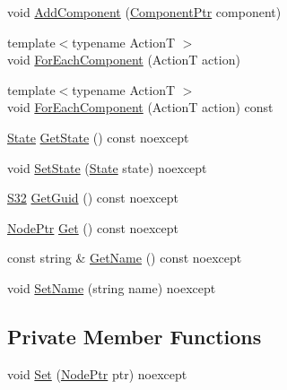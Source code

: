 \begin{DoxyCompactItemize}
\item 
void \hyperlink{classmage_1_1_node_a53172eaa92e0fa127bfe362349c96734}{Add\+Component} (\hyperlink{classmage_1_1_node_a46b7e1f4f5b98bfa78ed96a80797a4ba}{Component\+Ptr} component)
\item 
{\footnotesize template$<$typename ActionT $>$ }\\void \hyperlink{classmage_1_1_node_ac90a83642d3043ac6fc4efd14f922877}{For\+Each\+Component} (ActionT action)
\item 
{\footnotesize template$<$typename ActionT $>$ }\\void \hyperlink{classmage_1_1_node_ac3c83c2fcd0ee99277d0120396ffa81e}{For\+Each\+Component} (ActionT action) const
\item 
\hyperlink{namespacemage_a8159a53ed2ac3a0fe7058b2a051fa969}{State} \hyperlink{classmage_1_1_node_a05980bc835cf8da96a9abb225eae72da}{Get\+State} () const noexcept
\item 
void \hyperlink{classmage_1_1_node_a9511a52ddcc0bba71a0353338dcd1d9b}{Set\+State} (\hyperlink{namespacemage_a8159a53ed2ac3a0fe7058b2a051fa969}{State} state) noexcept
\item 
\hyperlink{namespacemage_a642e05c5c83642b6946703615cdbf2da}{S32} \hyperlink{classmage_1_1_node_a41474294afb1064796ff8a75413734f3}{Get\+Guid} () const noexcept
\item 
\hyperlink{classmage_1_1_node_ac575dc006e0ae1134277ade977dc06b6}{Node\+Ptr} \hyperlink{classmage_1_1_node_ac317011c240a845fbdb7209e26d560f2}{Get} () const noexcept
\item 
const string \& \hyperlink{classmage_1_1_node_a206e7c7ef80a0561b31ebbb9d05c98a0}{Get\+Name} () const noexcept
\item 
void \hyperlink{classmage_1_1_node_a78e4ef8457d200662d2f4881cef08688}{Set\+Name} (string name) noexcept
\end{DoxyCompactItemize}
\subsection*{Private Member Functions}
\begin{DoxyCompactItemize}
\item 
void \hyperlink{classmage_1_1_node_aabbe500cdf7842b663bfcf034de25c5a}{Set} (\hyperlink{classmage_1_1_node_ac575dc006e0ae1134277ade977dc06b6}{Node\+Ptr} ptr) noexcept
\end{DoxyCompactItemize}
